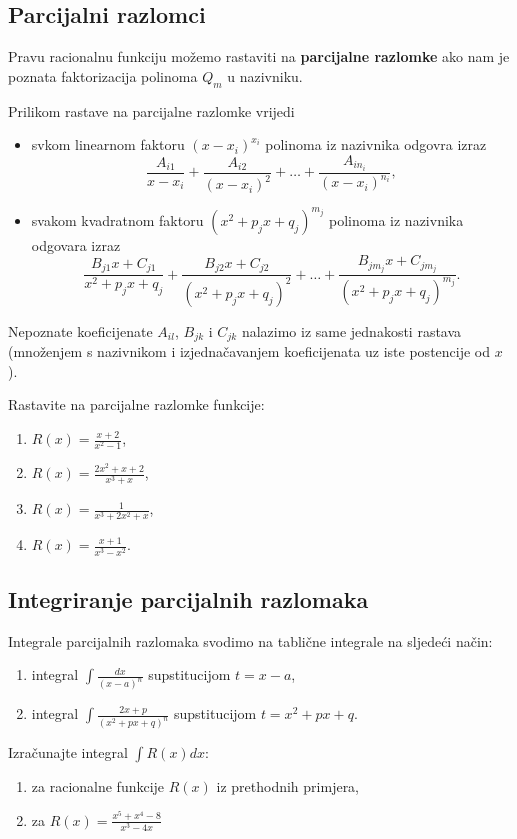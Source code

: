 \subsection{Parcijalni razlomci}

Pravu racionalnu funkciju možemo rastaviti na \textbf{parcijalne razlomke} ako
nam je poznata faktorizacija polinoma $Q_m$ u nazivniku.

Prilikom rastave na parcijalne razlomke vrijedi
\begin{itemize}
    \item svkom linearnom faktoru $(x-x_i)^{x_i}$ polinoma iz nazivnika odgovra
    izraz
    $$
      \frac{A_{i1}}{x-x_i} + \frac{A_{i2}}{(x-x_i)^2} + \dots + \frac{A_{in_i}}{(x-x_i)^{n_i}},
    $$
    \item svakom kvadratnom faktoru $(x^2+p_jx+q_j)^{m_j}$ polinoma iz nazivnika
    odgovara izraz
    $$
      \frac{B_{j1}x+C_{j1}}{x^2+p_jx+q_j} + \frac{B_{j2}x+C_{j2}}{(x^2+p_jx+q_j)^2} + \dots + \frac{B_{jm_j}x+C_{jm_j}}{(x^2+p_jx+q_j)^{m_j}}.
    $$
\end{itemize}

Nepoznate koeficijenate $A_{il}$, $B_{jk}$ i $C_{jk}$ nalazimo iz same
jednakosti rastava (množenjem s nazivnikom i izjednačavanjem koeficijenata uz
iste postencije od $x$).

\begin{example}
    Rastavite na parcijalne razlomke funkcije:
    \begin{enumerate}
        \item $R(x)=\frac{x+2}{x^2-1}$,
        \item $R(x)=\frac{2x^2+x+2}{x^3+x}$,
        \item $R(x)=\frac{1}{x^3+2x^2+x}$,
        \item $R(x)=\frac{x+1}{x^3-x^2}$.
    \end{enumerate}
\end{example}

\subsection{Integriranje parcijalnih razlomaka}

Integrale parcijalnih razlomaka svodimo na tablične integrale na sljedeći način:

\begin{enumerate}
    \item integral $\int \frac{dx}{(x-a)^n}$ supstitucijom $t=x-a$,
    \item integral $\int \frac{2x+p}{(x^2+px+q)^n}$ supstitucijom $t=x^2+px+q$.
\end{enumerate}

\begin{example}
    Izračunajte integral $\int R(x) dx$:
    \begin{enumerate}
        \item za racionalne funkcije $R(x)$ iz prethodnih primjera,
        \item za $R(x) = \frac{x^5+x^4-8}{x^3-4x}$
    \end{enumerate}
\end{example}
